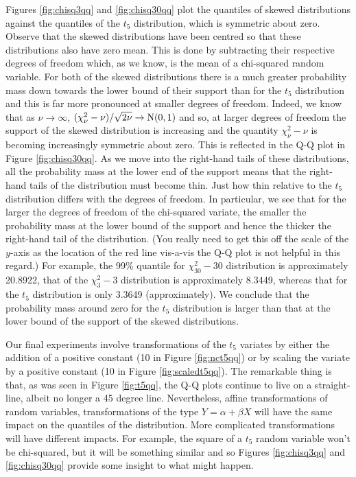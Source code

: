 Figures \ref{fig:chisq3qq} and \ref{fig:chisq30qq} plot the quantiles of skewed distributions
against the quantiles of the \( t_{5} \) distribution, which is symmetric about zero.  Observe that
the skewed distributions have been centred so that these distributions also have zero mean.  This is
done by subtracting their respective degrees of freedom which, as we know, is the mean of a
chi-squared random variable.  For both of the skewed distributions there is a much greater
probability mass down towards the lower bound of their support than for the \( t_{5} \) distribution
and this is far more pronounced at smaller degrees of freedom.  Indeed, we know that as \(
\nu\to\infty \), \( (\chi^{2}_{\nu}-\nu)/\sqrt{2\nu}\to\operatorname{N}(0,1) \) and so, at larger degrees of
freedom the support of the skewed distribution is increasing and the quantity \( \chi^{2}_{\nu}-\nu
\) is becoming increasingly symmetric about zero.  This is reflected in the Q-Q plot in Figure
\ref{fig:chisq30qq}.  As we move into the right-hand tails of these distributions, all the
probability mass at the lower end of the support means that the right-hand tails of the distribution
must become thin.  Just how thin relative to the \( t_{5} \) distribution differs with the degrees
of freedom.  In particular, we see that for the larger the degrees of freedom of the chi-squared
variate, the smaller the probability mass at the lower bound of the support and hence the thicker
the right-hand tail of the distribution.  (You really need to get this off the scale of the \( y
\)-axis as the location of the red line vis-a-vis the Q-Q plot is not helpful in this regard.)  For
example, the 99\% quantile for \( \chi^{2}_{30}-30 \) distribution is approximately 20.8922, that of
the \( \chi^{2}_{3}-3 \) distribution is approximately 8.3449, whereas that for the \( t_{5} \)
distribution is only 3.3649 (approximately).  We conclude that the probability mass around zero for
the \( t_{5} \) distribution is larger than that at the lower bound of the support of the skewed
distributions.

Our final experiments involve transformations of the \( t_{5} \) variates by either the addition of
a positive constant (10 in Figure \ref{fig:nct5qq}) or by scaling the variate by a positive
constant (10 in Figure \ref{fig:scaledt5qq}).  The remarkable thing is that, as was seen in Figure
\ref{fig:t5qq}, the Q-Q plots continue to live on a straight-line, albeit no longer a 45 degree
line.  Nevertheless, affine transformations of random variables, transformations of the type \(
Y=\alpha+\beta X \) will have the same impact on the quantiles of the distribution.  More
complicated transformations will have different impacts.  For example, the square of a \( t_{5} \)
random variable won't be chi-squared, but it will be something similar and so Figures
\ref{fig:chisq3qq} and \ref{fig:chisq30qq} provide some insight to what might happen.



